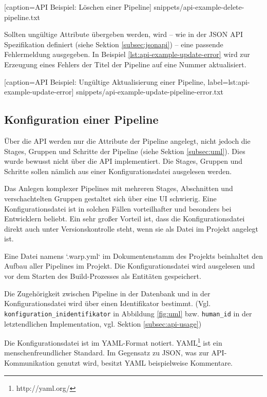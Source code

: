 
  [caption={API Beispiel: Löschen einer Pipeline}]
  {snippets/api-example-delete-pipeline.txt}

Sollten ungültige Attribute übergeben werden, wird – wie in der JSON API Spezifikation definiert (siehe Sektion \ref{subsec:jsonapi}) – eine passende Fehlermeldung ausgegeben. In Beispiel \ref{lst:api-example-update-error} wird zur Erzeugung eines Fehlers der Titel der Pipeline auf eine Nummer aktualisiert.


  [caption={API Beispiel: Ungültige Aktualisierung einer Pipeline},
  label={lst:api-example-update-error}]
  {snippets/api-example-update-pipeline-error.txt}


\subsection{Konfiguration einer Pipeline}

Über die API werden nur die Attribute der Pipeline angelegt, nicht jedoch die Stages, Gruppen und Schritte der Pipeline (siehe Sektion \ref{subsec:uml}). Dies wurde bewusst nicht über die API implementiert. Die Stages, Gruppen und Schritte sollen nämlich aus einer Konfigurationsdatei ausgelesen werden.

Das Anlegen komplexer Pipelines mit mehreren Stages, Abschnitten und verschachtelten Gruppen gestaltet sich über eine UI schwierig. Eine Konfigurationsdatei ist in solchen Fällen vorteilhafter und besonders bei Entwicklern beliebt. Ein sehr großer Vorteil ist, dass die Konfigurationsdatei direkt auch unter Versionskontrolle steht, wenn sie als Datei im Projekt angelegt ist.

Eine Datei namens `.warp.yml` im Dokumentenstamm des Projekts beinhaltet den Aufbau aller Pipelines im Projekt. Die Konfigurationsdatei wird ausgelesen und vor dem Starten des Build-Prozesses als Entitäten gespeichert.

Die Zugehörigkeit zwischen Pipeline in der Datenbank und in der Konfigurationsdatei wird über einen Identifikator bestimmt. (Vgl. \texttt{konfiguration\_\allowbreak inidentifikator} in Abbildung \ref{fig:uml} bzw. \texttt{human\_id} in der letztendlichen Implementation, vgl. Sektion \ref{subsec:api-usage})

Die Konfigurationsdatei ist im YAML-Format notiert. YAML\footnote{http://yaml.org/} ist ein menschenfreundlicher Standard. Im Gegensatz zu JSON, was zur API-Kommunikation genutzt wird, besitzt YAML beispielweise Kommentare.

